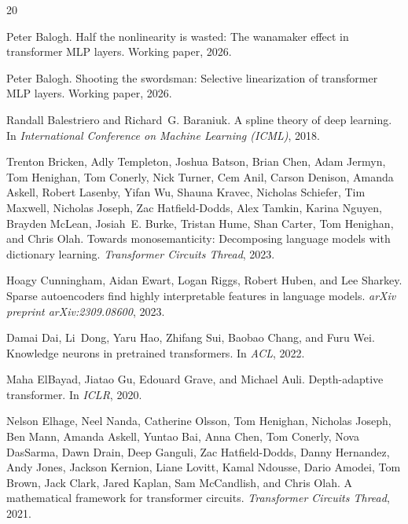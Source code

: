 \documentclass{article}
\begin{document}
\begin{thebibliography}{20}

Peter Balogh.
\newblock Half the nonlinearity is wasted: The wanamaker effect in transformer MLP layers.
\newblock Working paper, 2026.

Peter Balogh.
\newblock Shooting the swordsman: Selective linearization of transformer MLP layers.
\newblock Working paper, 2026.

Randall Balestriero and Richard~G. Baraniuk.
\newblock A spline theory of deep learning.
\newblock In \emph{International Conference on Machine Learning (ICML)}, 2018.

Trenton Bricken, Adly Templeton, Joshua Batson, Brian Chen, Adam Jermyn, Tom Henighan,
  Tom Conerly, Nick Turner, Cem Anil, Carson Denison, Amanda Askell, Robert Lasenby,
  Yifan Wu, Shauna Kravec, Nicholas Schiefer, Tim Maxwell, Nicholas Joseph, Zac Hatfield-Dodds,
  Alex Tamkin, Karina Nguyen, Brayden McLean, Josiah~E. Burke, Tristan Hume, Shan Carter,
  Tom Henighan, and Chris Olah.
\newblock Towards monosemanticity: Decomposing language models with dictionary learning.
\newblock \emph{Transformer Circuits Thread}, 2023.

Hoagy Cunningham, Aidan Ewart, Logan Riggs, Robert Huben, and Lee Sharkey.
\newblock Sparse autoencoders find highly interpretable features in language models.
\newblock \emph{arXiv preprint arXiv:2309.08600}, 2023.

Damai Dai, Li~Dong, Yaru Hao, Zhifang Sui, Baobao Chang, and Furu Wei.
\newblock Knowledge neurons in pretrained transformers.
\newblock In \emph{ACL}, 2022.

Maha ElBayad, Jiatao Gu, Edouard Grave, and Michael Auli.
\newblock Depth-adaptive transformer.
\newblock In \emph{ICLR}, 2020.

Nelson Elhage, Neel Nanda, Catherine Olsson, Tom Henighan, Nicholas Joseph, Ben Mann,
  Amanda Askell, Yuntao Bai, Anna Chen, Tom Conerly, Nova DasSarma, Dawn Drain,
  Deep Ganguli, Zac Hatfield-Dodds, Danny Hernandez, Andy Jones, Jackson Kernion,
  Liane Lovitt, Kamal Ndousse, Dario Amodei, Tom Brown, Jack Clark, Jared Kaplan,
  Sam McCandlish, and Chris Olah.
\newblock A mathematical framework for transformer circuits.
\newblock \emph{Transformer Circuits Thread}, 2021.


\end{thebibliography}
\end{document}
